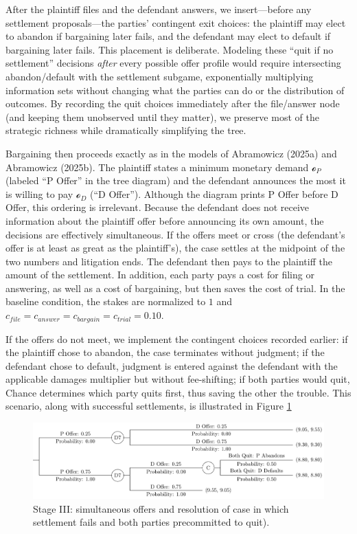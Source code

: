 \documentclass{article}
\begin{document}
After the plaintiff files and the defendant answers, we insert—before any settlement proposals—the parties’ contingent exit choices: the plaintiff may elect to abandon if bargaining later fails, and the defendant may elect to default if bargaining later fails. This placement is deliberate. Modeling these “quit if no settlement” decisions \emph{after} every possible offer profile would require intersecting abandon/default with the settlement subgame, exponentially multiplying information sets without changing what the parties can do or the distribution of outcomes. By recording the quit choices immediately after the file/answer node (and keeping them unobserved until they matter), we preserve most of the strategic richness while dramatically simplifying the tree.

Bargaining then proceeds exactly as in the models of Abramowicz (2025a) and Abramowicz (2025b). The plaintiff states a minimum monetary demand $\mathcal{o}_P$ (labeled “P Offer” in the tree diagram) and the defendant announces the most it is willing to pay $\mathcal{o}_D$ (“D Offer”). Although the diagram prints P Offer before D Offer, this ordering is irrelevant. Because the defendant does not receive information about the plaintiff offer before announcing its own amount, the decisions are effectively simultaneous. If the offers meet or cross (the defendant's offer is at least as great as the plaintiff's), the case settles at the midpoint of the two numbers and litigation ends. The defendant then pays to the plaintiff the amount of the settlement. In addition, each party pays a cost for filing or answering, as well as a cost of bargaining, but then saves the cost of trial. In the baseline condition, the stakes are normalized to $1$ and $c_{file} = c_{answer} = c_{bargain} = c_{trial} = 0.10$.

If the offers do not meet, we implement the contingent choices recorded earlier: if the plaintiff chose to abandon, the case terminates without judgment; if the defendant chose to default, judgment is entered against the defendant with the applicable damages multiplier but without fee-shifting; if both parties would quit, Chance determines which party quits first, thus saving the other the trouble. This scenario, along with successful settlements, is illustrated in Figure \ref{fig:smalltree_end.pdf}

  \begin{figure}[t]
    \centering
    \includegraphics[width=\textwidth]{../Figures/smalltree_end.pdf}
    \caption{Stage III: simultaneous offers and resolution of case in which settlement fails and both parties precommitted to quit).}
    \label{fig:smalltree_end.pdf}
  \end{figure}
\end{document}
